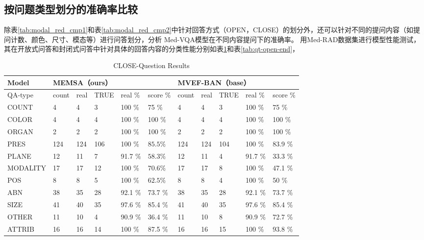 \subsection{按问题类型划分的准确率比较}
除表\ref{tab:modal_red_cmp1}和表\ref{tab:modal_red_cmp2}中针对回答方式（OPEN，CLOSE）的划分外，还可以针对不同的提问内容（如提问计数、颜色、尺寸、模态等）进行问答划分，分析
Med-VQA模型在不同内容提问下的准确率。
用Med-RAD数据集进行模型性能测试，其在开放式问答和封闭式问答中针对具体的回答内容的分类性能分别如表\ref{tab:qt-close-end}和表\ref{tab:qt-open-end}，
\begin{table}
	\caption{\label{tab:qt-close-end}CLOSE-Question Results}
	\centering
	\small %
	\begin{tabular}{l|lllll|lllll} %
		\hline Model & \multicolumn{5}{l}{\textbf{MEMSA（ours）}} & \multicolumn{5}{|l}{\textbf{MVEF-BAN}（base）} \\ 
		\hline QA-type & count & real & TRUE & real \% & score \% & count & real & TRUE & real \% & score \%\\ 
		\hline COUNT & 4 & 4 & 3 & 100 \%& 75 \%& 4 & 4 & 3 & 100 \%& 75 \%\\
		COLOR & 4 & 4 & 4 & 100 \%& 100 \%& 4 & 4 & 4 & 100 \%& 100 \%\\
		ORGAN & 2 & 2 & 2 & 100 \%& 100 \%& 2 & 2 & 2 & 100 \%& 100 \%\\
		PRES & 124 & 124 & 106 & 100 \%& $\mathbf{85.5 \%}$& 124 & 124 & 104 & 100 \%& 83.9 \%\\
		PLANE & 12 & 11 & 7 & 91.7 \%& $\mathbf{58.3 \%}$& 12 & 11 & 4 & 91.7 \%& 33.3 \%\\
		MODALITY & 17 & 17 & 12 & 100 \%& $\mathbf{70.6 \%}$& 17 & 17 & 8 & 100 \%& 47.1 \%\\
		POS & 8 & 8 & 5 & 100 \%& $\mathbf{62.5 \%}$& 8 & 8 & 4 & 100 \%& 50 \%\\
		ABN & 38 & 35 & 28 & 92.1 \%& 73.7 \%& 38 & 35 & 28 & 92.1 \%& 73.7 \%\\
		SIZE & 41 & 40 & 35 & 97.6 \%& 85.4 \%& 41 & 40 & 35 & 97.6 \%& 85.4 \%\\
		OTHER & 11 & 10 & 4 & 90.9 \%& 36.4 \%& 11 & 10 & 8 & 90.9 \%& 72.7 \%\\
		ATTRIB & 16 & 16 & 14 & 100 \%& 87.5 \%& 16 & 16 & 15 & 100 \%& 93.8 \%\\
		\hline
		\end{tabular}
\end{table}

